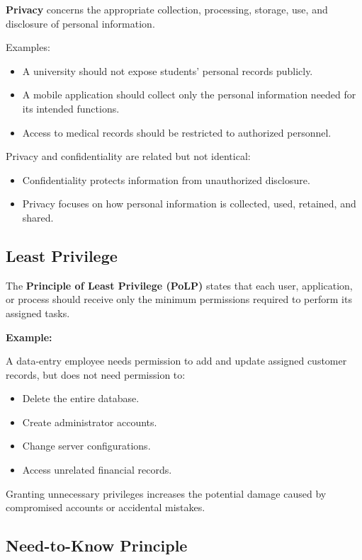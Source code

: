 \textbf{Privacy} concerns the appropriate collection, processing, storage, use, and disclosure of personal information.

Examples:

\begin{itemize}
\item A university should not expose students' personal records publicly.
\item A mobile application should collect only the personal information needed for its intended functions.
\item Access to medical records should be restricted to authorized personnel.
\end{itemize}

Privacy and confidentiality are related but not identical:

\begin{itemize}
\item Confidentiality protects information from unauthorized disclosure.
\item Privacy focuses on how personal information is collected, used, retained, and shared.
\end{itemize}

\subsection{Least Privilege}

The \textbf{Principle of Least Privilege (PoLP)} states that each user, application, or process should receive only the minimum permissions required to perform its assigned tasks.

\textbf{Example:}

A data-entry employee needs permission to add and update assigned customer records, but does not need permission to:

\begin{itemize}
\item Delete the entire database.
\item Create administrator accounts.
\item Change server configurations.
\item Access unrelated financial records.
\end{itemize}

Granting unnecessary privileges increases the potential damage caused by compromised accounts or accidental mistakes.

\subsection{Need-to-Know Principle}

